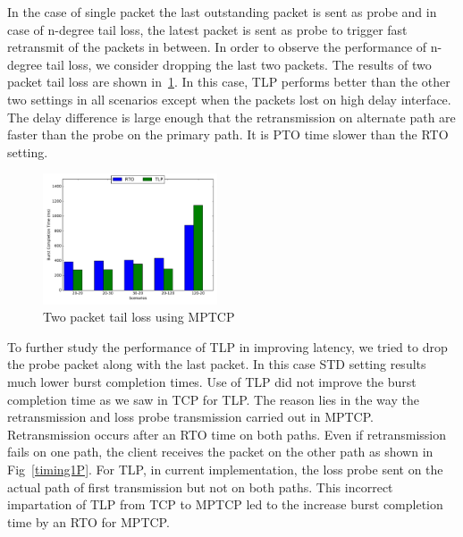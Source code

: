 \documentclass[10pt,draftcls,twocolumn]{IEEEconf}
\begin{document}
In the case of single packet the last outstanding packet is sent as probe and in case of n-degree tail loss,
the latest packet is sent as probe to trigger fast retransmit of the packets in between. In order to observe
the performance of n-degree tail loss, we consider dropping the last two packets. 
The results of two packet tail loss are shown in~\ref{2p}. In this case, TLP performs better than the other 
two settings in all scenarios except when the packets lost on high delay interface. The delay difference is
large enough that the retransmission on alternate path are faster than the probe on the primary path. It 
is PTO time slower than the RTO setting.


\begin{figure}[!ht]
\begin{center}
\includegraphics[angle=0, width=0.46\textwidth,natwidth=578.16,natheight=433.62]{plots/2P.pdf}
\caption{Two packet tail loss using MPTCP}\label{2p}
\end{center}
\end{figure}

To further study the performance of TLP in improving latency, we tried to drop the probe packet along with the last packet. In this case STD
setting results much lower burst completion times. Use of TLP did not improve the burst completion time as we saw in TCP for TLP. The reason
lies in the way the retransmission and loss probe transmission carried out in MPTCP. Retransmission occurs after an RTO time on both paths.
Even if retransmission fails on one path, the client receives the packet on the other path as shown in Fig~\ref{timing1P}. For TLP, in
current implementation, the loss probe sent on the actual path of first transmission but not on both paths. This incorrect impartation of
TLP from TCP to MPTCP led to the increase burst completion time by an RTO for MPTCP. 
\end{document}

